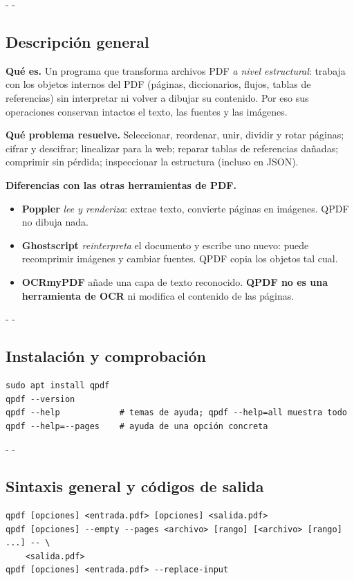 \documentclass[11pt,a4paper]{article}
\makeatletter
\newcommand{\necesitaespacio}[1]{\par\penalty-100\begingroup
	\setlength{\dimen@}{#1}\dimen@ii\pagegoal\advance\dimen@ii-\pagetotal
	\ifdim\dimen@>\dimen@ii\ifdim\dimen@ii>\z@\vfil\fi\penalty-\@M\fi\endgroup}
\makeatother
\begin{document}
	\necesitaespacio{8\baselineskip}
	\subsection{Descripción general}
	
	\textbf{Qué es.} Un programa que transforma archivos PDF \emph{a nivel estructural}: trabaja con los objetos internos del PDF (páginas, diccionarios, flujos, tablas de referencias) sin interpretar ni volver a dibujar su contenido. Por eso sus operaciones conservan intactos el texto, las fuentes y las imágenes.
	
	\textbf{Qué problema resuelve.} Seleccionar, reordenar, unir, dividir y rotar páginas; cifrar y descifrar; linealizar para la web; reparar tablas de referencias dañadas; comprimir sin pérdida; inspeccionar la estructura (incluso en JSON).
	
	\textbf{Diferencias con las otras herramientas de PDF.}
	\begin{itemize}
		\item \textbf{Poppler} \emph{lee y renderiza}: extrae texto, convierte páginas en imágenes. QPDF no dibuja nada.
		\item \textbf{Ghostscript} \emph{reinterpreta} el documento y escribe uno nuevo: puede recomprimir imágenes y cambiar fuentes. QPDF copia los objetos tal cual.
		\item \textbf{OCRmyPDF} añade una capa de texto reconocido. \textbf{QPDF no es una herramienta de OCR} ni modifica el contenido de las páginas.
	\end{itemize}
	
	\necesitaespacio{8\baselineskip}
	\subsection{Instalación y comprobación}
	
	\begin{lstlisting}
sudo apt install qpdf
qpdf --version
qpdf --help            # temas de ayuda; qpdf --help=all muestra todo
qpdf --help=--pages    # ayuda de una opción concreta
\end{lstlisting}
	
	\necesitaespacio{8\baselineskip}
	\subsection{Sintaxis general y códigos de salida}
	
	\begin{lstlisting}[style=sintaxis]
qpdf [opciones] <entrada.pdf> [opciones] <salida.pdf>
qpdf [opciones] --empty --pages <archivo> [rango] [<archivo> [rango] ...] -- \
    <salida.pdf>
qpdf [opciones] <entrada.pdf> --replace-input
\end{lstlisting}
	
\end{document}

